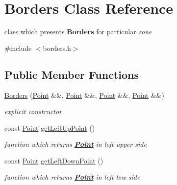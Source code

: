 \hypertarget{class_borders}{}\section{Borders Class Reference}
\label{class_borders}


class which presents {\bfseries{\mbox{\hyperlink{class_borders}{Borders}}}} for particular {\itshape zone}  




{\ttfamily \#include $<$borders.\+h$>$}

\subsection*{Public Member Functions}
\begin{DoxyCompactItemize}
\item 
\mbox{\label{class_borders_a8b79573e755b5b0475b52db5eadc02a0}} 
\mbox{\hyperlink{class_borders_a8b79573e755b5b0475b52db5eadc02a0}{Borders}} (\mbox{\hyperlink{class_point}{Point}} \&\&, \mbox{\hyperlink{class_point}{Point}} \&\&, \mbox{\hyperlink{class_point}{Point}} \&\&, \mbox{\hyperlink{class_point}{Point}} \&\&)
\begin{DoxyCompactList}\small\item\em explicit {\itshape constructor} \end{DoxyCompactList}\item 
\mbox{\label{class_borders_a2896d45c0854528bf1450038a202cadd}} 
const \mbox{\hyperlink{class_point}{Point}} \mbox{\hyperlink{class_borders_a2896d45c0854528bf1450038a202cadd}{get\+Left\+Up\+Point}} ()
\begin{DoxyCompactList}\small\item\em {\itshape function} which returns {\bfseries{\mbox{\hyperlink{class_point}{Point}}}} in {\itshape left} {\itshape upper} {\itshape side} \end{DoxyCompactList}\item 
\mbox{\label{class_borders_a19dcb0a8bd28ff028753fffcde142c54}} 
const \mbox{\hyperlink{class_point}{Point}} \mbox{\hyperlink{class_borders_a19dcb0a8bd28ff028753fffcde142c54}{get\+Left\+Down\+Point}} ()
\begin{DoxyCompactList}\small\item\em {\itshape function} which returns {\bfseries{\mbox{\hyperlink{class_point}{Point}}}} in {\itshape left} {\itshape low} {\itshape side} \end{DoxyCompactList}\item 

\end{DoxyCompactItemize}
